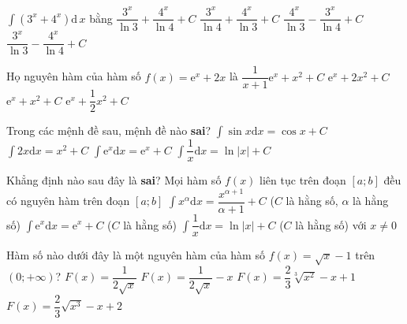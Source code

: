 \begin{ex}%
	$\displaystyle\int (3^x+4^x)\mathrm{d}\,x$ bằng
	\choice
	{\True  $\dfrac{3^x}{\ln 3}+\dfrac{4^x}{\ln 4}+C$}
	{$\dfrac{3^x}{\ln 4}+\dfrac{4^x}{\ln 3}+C$}
	{$\dfrac{4^x}{\ln 3}-\dfrac{3^x}{\ln 4}+C$}
	{$\dfrac{3^x}{\ln 3}-\dfrac{4^x}{\ln 4}+C$}
\end{ex} 
\begin{ex}%
	Họ nguyên hàm của hàm số $f(x)=\mathrm{e}^x+2x$ là
	\choice
	{ $\dfrac{1}{x+1}\mathrm{e}^x+x^2+C$}
	{$\mathrm{e}^x+2x^2+C$}
	{\True $\mathrm{e}^x+x^2+C$}
	{$\mathrm{e}^x+\dfrac{1}{2} x^2+C$}
\end{ex} 
\begin{ex}%
	Trong các mệnh đề sau, mệnh đề nào \textbf{sai}?
	\choice
	{\True  $\displaystyle\int\sin x\mathrm{d}x=\cos x+C$}
	{$\displaystyle\int 2x\mathrm{d}x=x^2+C$}
	{$\displaystyle\int \mathrm{e}^x\mathrm{d}x=\mathrm{e}^x+C$}
	{$\displaystyle\int \dfrac{1}{x}\mathrm{d}x=\ln \left| x \right|+C$}
\end{ex} 
\begin{ex}%
	Khẳng định nào sau đây là \textbf{sai}?
	\choice
	{ Mọi hàm số $f(x)$ liên tục trên đoạn $[a;b]$ đều có nguyên hàm trên đoạn $[a;b]$}
	{\True $\displaystyle\int x^\alpha \mathrm{d}x=\dfrac{x^{\alpha +1}}{\alpha +1}+C$ ($C$ là hằng số, $\alpha $ là hằng số)}
	{$\displaystyle\int \mathrm{e}^x\mathrm{d}x=\mathrm{e}^x+C$ ($C$ là hằng số)}
	{$\displaystyle\int{\dfrac{1}{x}\mathrm{d}x=\ln \left| x \right|+C}$ ($C$ là hằng số) với $x\ne 0$}
\end{ex} 
\begin{ex}%
	Hàm số nào dưới đây là một nguyên hàm của hàm số $f(x)=\sqrt{x}-1$ trên $(0;+\infty)$?
	\choice
	{$F(x)=\dfrac{1}{2\sqrt{x}}$}
	{$F(x)=\dfrac{1}{2\sqrt{x}}-x$}
	{$F(x)=\dfrac{2}{3}\sqrt[3]{x^2}-x+1$}
	{\True $F(x)=\dfrac{2}{3}\sqrt{x^3}-x+2$}
\end{ex} 
